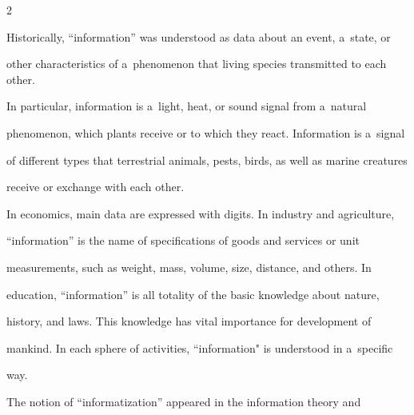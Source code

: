 










      \thispagestyle{myheadings}



      \begin{multicols}{2}



                  \label{st\stat}



\noindent

   Historically, ``information'' was understood as data about an event, a~state, or 

other characteristics of a~phenomenon that living species transmitted to each other. 

In particular, information is a~light, heat, or sound signal from a~natural 

phenomenon, which plants receive or to which they react. Information is a~signal 

of different types that terrestrial animals, pests, birds, as well as marine creatures 

receive or exchange with each other.

{



}

   

   In economics, main data are expressed with digits. In industry and agriculture, 

``information'' is the name of specifications of goods and services or unit 

measurements, such as weight, mass, volume, size, distance, and others. In 

education, ``information'' is all totality of the basic knowledge about nature, 

history, and laws. This knowledge has vital importance for development of 

mankind. In each sphere of activities, ``information" is understood in a~specific 

way.

   

   The notion of ``informatization'' appeared in the information theory and 


\end{multicols}
